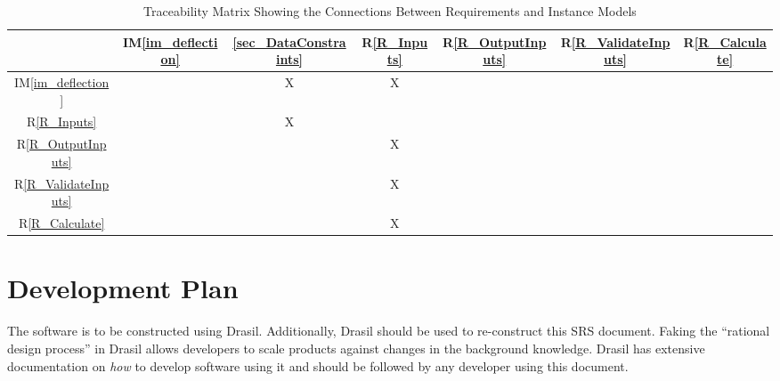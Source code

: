 \documentclass[12pt]{article}
\newcommand{\iref}[1]{IM\ref{#1}}
\newcommand{\rref}[1]{R\ref{#1}}
\begin{document}
\begin{table}[h!]
    \centering
    \begin{tabular}{|c|c|c|c|c|c|c|}
        \hline
                                & \iref{im_deflection} & \ref{sec_DataConstraints} & \rref{R_Inputs} & \rref{R_OutputInputs} & \rref{R_ValidateInputs} & \rref{R_Calculate} \\ \hline
        \iref{im_deflection}    &                      & X                         & X               &                       &                         &                    \\ \hline
        \rref{R_Inputs}         &                      & X                         &                 &                       &                         &                    \\ \hline
        \rref{R_OutputInputs}   &                      &                           & X               &                       &                         &                    \\ \hline
        \rref{R_ValidateInputs} &                      &                           & X               &                       &                         &                    \\ \hline
        \rref{R_Calculate}      &                      &                           & X               &                       &                         &                    \\ \hline
    \end{tabular}
    \caption{Traceability Matrix Showing the Connections Between Requirements and Instance Models}
    \label{Table:R_trace}
\end{table}


\section{Development Plan}
\label{sec_development_plan}

The software is to be constructed using Drasil. Additionally, Drasil should be
used to re-construct this SRS document. Faking the ``rational design process''
in Drasil allows developers to scale products against changes in the background
knowledge. Drasil has extensive documentation on \textit{how} to develop
software using it and should be followed by any developer using this document.
\end{document}
